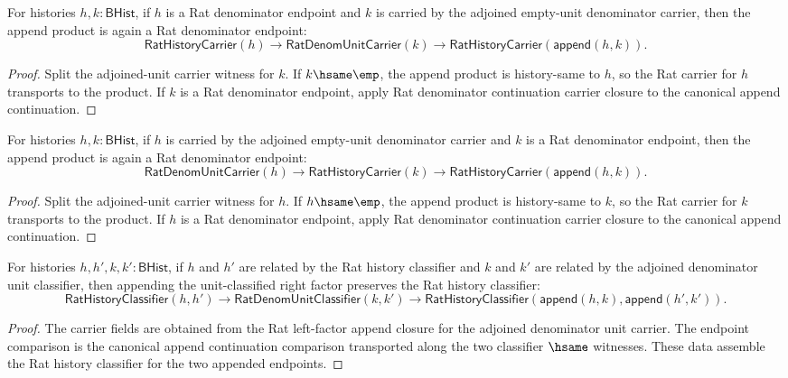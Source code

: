 \begin{theorem}
\label{thm:rat-denom-unit-carrier-append-left-rat-closed}
For histories $h,k:\mathsf{BHist}$, if $h$ is a Rat denominator endpoint and
$k$ is carried by the adjoined empty-unit denominator carrier, then the append
product is again a Rat denominator endpoint:
$$
\mathsf{RatHistoryCarrier}(h)\to
\mathsf{RatDenomUnitCarrier}(k)\to
\mathsf{RatHistoryCarrier}(\mathsf{append}(h,k)).
$$
\end{theorem}
\begin{proof}
Split the adjoined-unit carrier witness for $k$. If $k\hsame\emp$, the append
product is history-same to $h$, so the Rat carrier for $h$ transports to the
product. If $k$ is a Rat denominator endpoint, apply Rat denominator
continuation carrier closure to the canonical append continuation.
\end{proof}

\begin{theorem}
\label{thm:rat-denom-unit-carrier-append-right-rat-closed}
For histories $h,k:\mathsf{BHist}$, if $h$ is carried by the adjoined
empty-unit denominator carrier and $k$ is a Rat denominator endpoint, then the
append product is again a Rat denominator endpoint:
$$
\mathsf{RatDenomUnitCarrier}(h)\to
\mathsf{RatHistoryCarrier}(k)\to
\mathsf{RatHistoryCarrier}(\mathsf{append}(h,k)).
$$
\end{theorem}
\begin{proof}
Split the adjoined-unit carrier witness for $h$. If $h\hsame\emp$, the append
product is history-same to $k$, so the Rat carrier for $k$ transports to the
product. If $h$ is a Rat denominator endpoint, apply Rat denominator
continuation carrier closure to the canonical append continuation.
\end{proof}

\begin{theorem}
\label{thm:rat-history-classifier-append-right-denom-unit-closed}
For histories $h,h',k,k':\mathsf{BHist}$, if $h$ and $h'$ are related by the
Rat history classifier and $k$ and $k'$ are related by the adjoined denominator
unit classifier, then appending the unit-classified right factor preserves the
Rat history classifier:
$$
\mathsf{RatHistoryClassifier}(h,h')\to
\mathsf{RatDenomUnitClassifier}(k,k')\to
\mathsf{RatHistoryClassifier}(\mathsf{append}(h,k),\mathsf{append}(h',k')).
$$
\end{theorem}
\begin{proof}
The carrier fields are obtained from the Rat left-factor append closure for
the adjoined denominator unit carrier. The endpoint comparison is the
canonical append continuation comparison transported along the two classifier
$\hsame$ witnesses. These data assemble the Rat history classifier for the two
appended endpoints.
\end{proof}

